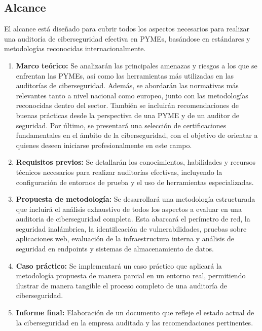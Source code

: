 \documentclass[a4paper, 11pt]{article}
\begin{document}
\subsection{Alcance}
\par\vspace{0.5cm}

El alcance está diseñado para cubrir todos los aspectos necesarios para realizar una auditoría de ciberseguridad efectiva en PYMEs, basándose en estándares y metodologías reconocidas internacionalmente.

\begin{enumerate}
\item \textbf{Marco teórico:} Se analizarán las principales amenazas y riesgos a los que se enfrentan las PYMEs, así como las herramientas más utilizadas en las auditorías de ciberseguridad. Además, se abordarán las normativas más relevantes tanto a nivel nacional como europeo, junto con las metodologías reconocidas dentro del sector. También se incluirán recomendaciones de buenas prácticas desde la perspectiva de una PYME y de un auditor de seguridad. Por último, se presentará una selección de certificaciones fundamentales en el ámbito de la ciberseguridad, con el objetivo de orientar a quienes deseen iniciarse profesionalmente en este campo.    
    \item \textbf{Requisitos previos:} Se detallarán los conocimientos, habilidades y recursos técnicos necesarios para realizar auditorías efectivas, incluyendo la configuración de entornos de prueba y el uso de herramientas especializadas.
        
    \item \textbf{Propuesta de metodología:} Se desarrollará una metodología estructurada que incluirá el análisis exhaustivo de todos los aspectos a evaluar en una auditoria de ciberseguridad completa. Esta abarcará el perímetro de red, la seguridad inalámbrica, la identificación de vulnerabilidades, pruebas sobre aplicaciones web, evaluación de la infraestructura interna y análisis de seguridad en endpoints y sistemas de almacenamiento de datos.
    
    \item \textbf{Caso práctico:} Se implementará un caso práctico que aplicará la metodología propuesta de manera parcial en un entorno real, permitiendo ilustrar de manera tangible el proceso completo de una auditoría de ciberseguridad.
    
    \item \textbf{Informe final:} Elaboración de un documento que refleje el estado actual de la ciberseguridad en la empresa auditada y las recomendaciones pertinentes.
\end{enumerate}
\end{document}
